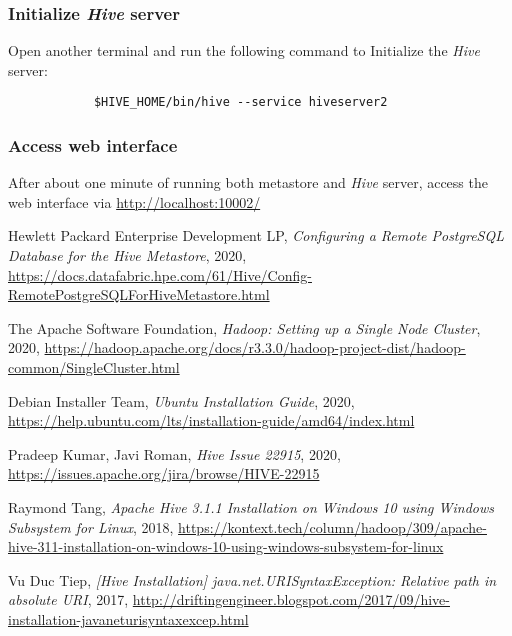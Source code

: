 \documentclass{article}
\begin{document}
        \subsubsection{Initialize \emph{Hive} server}
        Open another terminal and run the following command to Initialize the \emph{Hive} server:
        \begin{verbatim}
            $HIVE_HOME/bin/hive --service hiveserver2
        \end{verbatim}

        \subsubsection{Access web interface}
        After about one minute of running both metastore and \emph{Hive} server, access the web
        interface via \url{http://localhost:10002/}

\newpage
\begin{thebibliography}{9}
    Hewlett Packard Enterprise Development LP,
    \textit{Configuring a Remote PostgreSQL Database for the Hive Metastore},
    2020,
    \url{https://docs.datafabric.hpe.com/61/Hive/Config-RemotePostgreSQLForHiveMetastore.html}
    
    The Apache Software Foundation,
    \textit{Hadoop: Setting up a Single Node Cluster},
    2020,
    \url{https://hadoop.apache.org/docs/r3.3.0/hadoop-project-dist/hadoop-common/SingleCluster.html}

    Debian Installer Team,
    \textit{Ubuntu Installation Guide},
    2020,
    \url{https://help.ubuntu.com/lts/installation-guide/amd64/index.html}

    Pradeep Kumar, Javi Roman,
    \textit{Hive Issue 22915},
    2020,
    \url{https://issues.apache.org/jira/browse/HIVE-22915}

    Raymond Tang,
    \textit{Apache Hive 3.1.1 Installation on Windows 10 using Windows Subsystem for Linux},
    2018,
    \url{https://kontext.tech/column/hadoop/309/apache-hive-311-installation-on-windows-10-using-windows-subsystem-for-linux}

    Vu Duc Tiep,
    \textit{[Hive Installation] java.net.URISyntaxException: Relative path in absolute URI},
    2017,
    \url{http://driftingengineer.blogspot.com/2017/09/hive-installation-javaneturisyntaxexcep.html}
\end{thebibliography}
\end{document}
